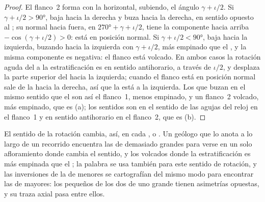 \begin{proof}
El flanco~2 forma con la horizontal, subiendo, el ángulo $\gamma + \iota/2$. Si $\gamma + \iota/2 > \ang{90}$, baja hacia la
derecha y buza hacia la derecha, en sentido opuesto al ; su normal hacia fuera, en $\ang{270} + \gamma +
\iota/2$, tiene la
componente hacia arriba $-\cos(\gamma + \iota/2) > 0$: está en posición normal. Si $\gamma + \iota/2 < \ang{90}$, baja hacia la
izquierda, buzando hacia la izquierda con $\gamma + \iota/2$, más empinado que el , y la misma componente es negativa: el
flanco está volcado. En ambos casos la rotación aguda del  a la estratificación es en sentido antihorario, a través de
$\iota/2$, y desplaza la parte superior del  hacia la izquierda; cuando el flanco está en posición normal sale de la 
hacia la derecha, así que la  está a la izquierda. Los  que buzan en el mismo sentido que el  son así el
flanco~1, menos empinado, y un flanco~2 volcado, más empinado, que es (a); los sentidos son en el sentido de las agujas del reloj
en el flanco~1 y en sentido antihorario en el flanco~2, que es (b).
\end{proof}

El sentido de la rotación cambia, así, en cada ,  o . Un geólogo que lo anota a lo largo de un recorrido
encuentra las  de  demasiado grandes para verse en un solo afloramiento donde cambia el sentido, y los 
volcados donde la estratificación es más empinada que el ; la palabra  se usa también para este sentido de
rotación, y las inversiones de la  de  menores se cartografían del mismo modo para encontrar las  de
 mayores: los pequeños  de los dos  de uno grande tienen asimetrías opuestas, y su traza axial pasa entre ellos.

